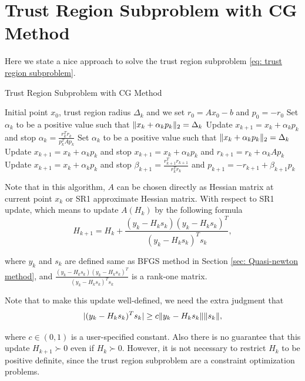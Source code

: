 \documentclass[11pt]{report}
\begin{document}
\section{Trust Region Subproblem with CG Method}
Here we state a nice approach to solve the trust region subproblem \eqref{eq: trust region subproblem}. 
\begin{algorithm}[H]
\caption{Trust Region Subproblem with CG Method}
\label{alg:Trust Region Subproblem with CG Method}
\begin{algorithmic}[1]
\REQUIRE Initial point $x_0$, trust region radius $\Delta_k$ and we set $r_0 = Ax_0-b$ and $p_0=-r_0$
\REPEAT
{}
\STATE Set $\alpha_k$ to be a positive value such that $\|x_k+\alpha_kp_k\|_2 = \Delta_k$
\STATE Update $x_{k+1} = x_k + \alpha_k p_k$ and stop
\ELSE
\STATE $\alpha_k = \frac{r_k^Tr_k}{p_k^TAp_k}$
\ENDIF
{}
\STATE Set $\alpha_k$ to be a positive value such that $\|x_k+\alpha_kp_k\|_2 = \Delta_k$
\STATE Update $x_{k+1} = x_k + \alpha_k p_k$ and stop
\ELSE
\STATE $x_{k+1} = x_k + \alpha_k p_k$ and $r_{k+1} = r_k + \alpha_kAp_k$
\ENDIF
{}
\STATE Update $x_{k+1} = x_k + \alpha_k p_k$ and stop
\ELSE
\STATE $\beta_{k+1} =\frac{r_{k+1}^Tr_{k+1}}{r_k^Tr_k}$ and $ p_{k+1} = -r_{k+1} + \beta_{k+1}p_k$
\ENDIF
{}
\end{algorithmic}
\end{algorithm}

Note that in this algorithm, $A$ can be chosen directly as Hessian matrix at current point $x_k$ or SR1 approximate Hessian matrix. With respect to SR1 update, which means to update $A(H_k)$ by the following formula
\begin{equation}
    H_{k+1} = H_k + \frac{(y_k-H_ks_k)(y_k-H_ks_k)^T}{(y_k-H_ks_k)^Ts_k},
\end{equation}

where $y_k$ and $s_k$ are defined same as BFGS method in Section \ref{sec: Quasi-newton method}, and $ \frac{(y_k-H_ks_k)(y_k-H_ks_k)^T}{(y_k-H_ks_k)^Ts_k}$ is a rank-one matrix.

Note that to make this update well-defined, we need the extra judgment that
\begin{equation}
    |(y_k-H_ks_k)^Ts_k| \geq c \|y_k-H_ks_k\|\|s_k\|,
\end{equation}

where $c\in(0,1)$ is a user-specified constant. Also there is no guarantee that this update $H_{k+1}\succ 0$ even if $H_k\succ 0$.  However, it is not necessary to restrict $H_k$ to be positive definite, since the trust region subproblem are a constraint optimization problems.
\end{document}
